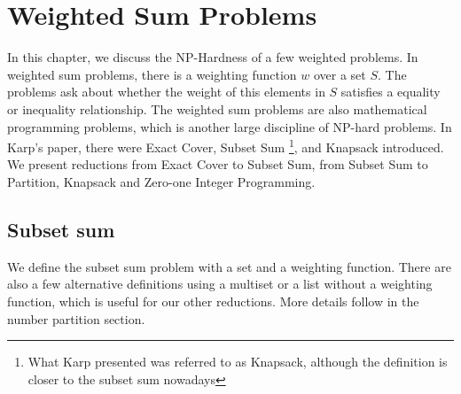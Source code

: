 \chapter{Weighted Sum Problems}\label{chapter:weighted}
In this chapter, we discuss the NP-Hardness of a few weighted problems. In weighted sum problems, 
there is a weighting function $w$ over a set $S$. The problems ask about whether the weight of this elements 
in $S$ satisfies a equality or inequality relationship. The weighted sum problems are also mathematical programming 
problems, which is another large discipline of NP-hard problems. In Karp's paper, there were Exact Cover, Subset Sum \footnote{What Karp presented was referred to as Knapsack, although
the definition is closer to the subset sum nowadays}, and Knapsack introduced. 
We present reductions from Exact Cover to Subset Sum, from Subset Sum to Partition, Knapsack and Zero-one Integer Programming. 

\section{Subset sum}
We define the subset sum problem with a set and a weighting function. There are also a few alternative definitions using a multiset or a list without 
a weighting function, which is useful for our other reductions. More details follow in the number partition section. 

